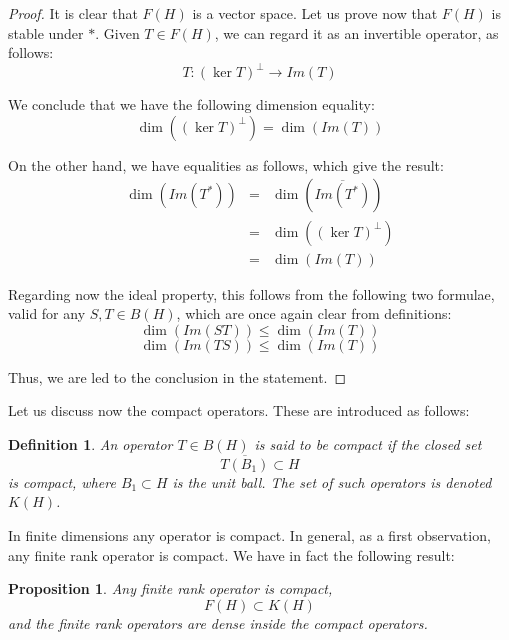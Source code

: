 \documentclass[12pt]{amsbook}
\newtheorem{definition}[theorem]{Definition}
\newtheorem{proposition}[theorem]{Proposition}
\begin{document}
\begin{proof}
It is clear that $F(H)$ is a vector space. Let us prove now that $F(H)$ is stable under $*$. Given $T\in F(H)$, we can regard it as an invertible operator, as follows:
$$T:(\ker T)^\perp\to Im(T)$$

We conclude that we have the following dimension equality:
$$\dim((\ker T)^\perp)=\dim(Im(T))$$

On the other hand, we have equalities as follows, which give the result:
\begin{eqnarray*}
\dim(Im(T^*))
&=&\dim(\overline{Im(T^*)})\\
&=&\dim((\ker T)^\perp)\\
&=&\dim(Im(T))
\end{eqnarray*}

Regarding now the ideal property, this follows from the following two formulae, valid for any $S,T\in B(H)$, which are once again clear from definitions:
$$\dim(Im(ST))\leq\dim(Im(T))$$
$$\dim(Im(TS))\leq\dim(Im(T))$$

Thus, we are led to the conclusion in the statement.
\end{proof}

Let us discuss now the compact operators. These are introduced as follows:


\begin{definition}
An operator $T\in B(H)$ is said to be compact if the closed set
$$\overline{T(B_1)}\subset H$$
is compact, where $B_1\subset H$ is the unit ball. The set of such operators is denoted $K(H)$.
\end{definition}

In finite dimensions any operator is compact. In general, as a first observation, any finite rank operator is compact. We have in fact the following result:

\begin{proposition}
Any finite rank operator is compact,
$$F(H)\subset K(H)$$
and the finite rank operators are dense inside the compact operators.
\end{proposition}
\end{document}
